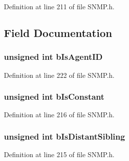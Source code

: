Definition at line 211 of file S\+N\+M\+P.\+h.



\subsection{Field Documentation}
\hypertarget{union_m_i_b___i_n_f_o_a695f706b73d78549556f5385b050f011}{}
\subsubsection[{b\+Is\+Agent\+I\+D}]{\setlength{\rightskip}{0pt plus 5cm}unsigned int b\+Is\+Agent\+I\+D}\label{union_m_i_b___i_n_f_o_a695f706b73d78549556f5385b050f011}


Definition at line 222 of file S\+N\+M\+P.\+h.

\hypertarget{union_m_i_b___i_n_f_o_a8379610ced9f0ff89ef3223c84c4ce1c}{}
\subsubsection[{b\+Is\+Constant}]{\setlength{\rightskip}{0pt plus 5cm}unsigned int b\+Is\+Constant}\label{union_m_i_b___i_n_f_o_a8379610ced9f0ff89ef3223c84c4ce1c}


Definition at line 216 of file S\+N\+M\+P.\+h.

\hypertarget{union_m_i_b___i_n_f_o_aa92c1d5f9f2904a36e2f475a3ef5bae1}{}
\subsubsection[{b\+Is\+Distant\+Sibling}]{\setlength{\rightskip}{0pt plus 5cm}unsigned int b\+Is\+Distant\+Sibling}\label{union_m_i_b___i_n_f_o_aa92c1d5f9f2904a36e2f475a3ef5bae1}


Definition at line 215 of file S\+N\+M\+P.\+h.

\hypertarget{union_m_i_b___i_n_f_o_a3261ab7b8974248ac32503f93ba0825c}{}
